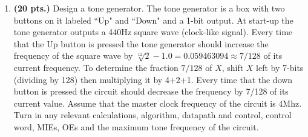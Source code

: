 \begin{enumerate}
\begin{onlysolution}
{} \end{onlysolution} 

\item \textbf{ (20 pts.)}
Design a tone generator.  The tone generator is a box with two buttons
on it labeled ``Up" and ``Down" and a 1-bit output.  At start-up the tone 
generator outputs
a 440Hz square wave (clock-like signal).  Every time that the Up button
is pressed the tone generator should increase the frequency of the square
wave by $\sqrt[12]{2}-1.0 = 0.059463094 \approx 7/128$ of its current frequency.  
To determine the fraction $7/128$ of $X$, shift $X$ left by 7-bits (dividing by
128) then multiplying it by 4+2+1.  Every time that the down button is pressed
the circuit should decrease the frequency by 7/128 of its current value.  Assume
that the master clock frequency of the circuit is 4Mhz.  Turn in 
any relevant calculations, algorithm, datapath and control, control word,
MIEs, OEs and the maximum tone frequency of the circuit.


\end{enumerate}
